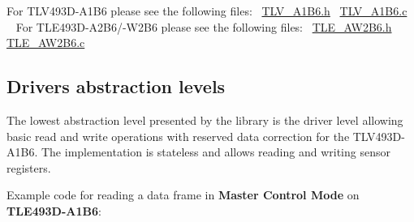 For T\+L\+V493\+D-\/\+A1\+B6 please see the following files\+:~\newline
 \mbox{\hyperlink{_t_l_v___a1_b6_8h}{T\+L\+V\+\_\+\+A1\+B6.\+h}}~\newline
 \mbox{\hyperlink{_t_l_v___a1_b6_8c}{T\+L\+V\+\_\+\+A1\+B6.\+c}}~\newline
 ~\newline
 For T\+L\+E493\+D-\/\+A2\+B6/-\/\+W2\+B6 please see the following files\+:~\newline
 \mbox{\hyperlink{_t_l_e___a_w2_b6_8h}{T\+L\+E\+\_\+\+A\+W2\+B6.\+h}}~\newline
 \mbox{\hyperlink{_t_l_e___a_w2_b6_8c}{T\+L\+E\+\_\+\+A\+W2\+B6.\+c}}~\newline
\hypertarget{index_s1s3}{}\subsection{Drivers abstraction levels}\label{index_s1s3}
The lowest abstraction level presented by the library is the driver level allowing basic read and write operations with reserved data correction for the T\+L\+V493\+D-\/\+A1\+B6. The implementation is stateless and allows reading and writing sensor registers.~\newline


Example code for reading a data frame in {\bfseries Master Control Mode} on {\bfseries T\+L\+E493\+D-\/\+A1\+B6}\+: ~\newline
 
